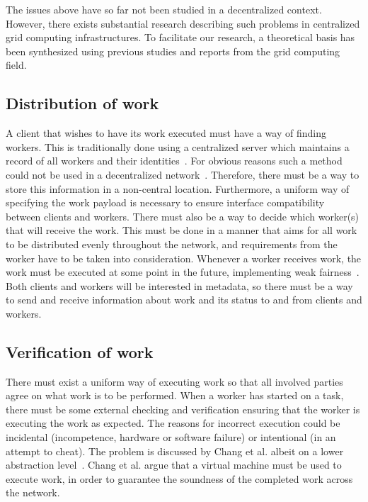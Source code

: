 The issues above have so far not been studied in a decentralized context. However, there exists substantial research describing such problems in centralized grid computing infrastructures. To facilitate our research, a theoretical basis has been synthesized using previous studies and reports from the grid computing field.

\subsection{Distribution of work}
\label{sec:prob:distribution}
A client that wishes to have its work executed must have a way of finding workers. This is traditionally done using a centralized server which maintains a record of all workers and their identities~\cite{anderson:2005}\cite{sarmenta:2002}. For obvious reasons such a method could not be used in a decentralized network~\cite{baran}. Therefore, there must be a way to store this information in a non-central location. Furthermore, a uniform way of specifying the work payload is necessary to ensure interface compatibility between clients and workers. There must also be a way to decide which worker(s) that will receive the work. This must be done in a manner that aims for all work to be distributed evenly throughout the network, and requirements from the worker have to be taken into consideration. Whenever a worker receives work, the work must be executed at some point in the future, implementing weak fairness~\cite{benari}. Both clients and workers will be interested in metadata, so there must be a way to send and receive information about work and its status to and from clients and workers.

\subsection{Verification of work}
\label{sec:prob:verification}
There must exist a uniform way of executing work so that all involved parties agree on what work is to be performed. When a worker has started on a task, there must be some external checking and verification ensuring that the worker is executing the work as expected. The reasons for incorrect execution could be incidental (incompetence, hardware or software failure) or intentional (in an attempt to cheat). The problem is discussed by Chang et al. albeit on a lower abstraction level~\cite{chang:2002}. Chang et al. argue that a virtual machine must be used to execute work, in order to guarantee the soundness of the completed work across the network.


